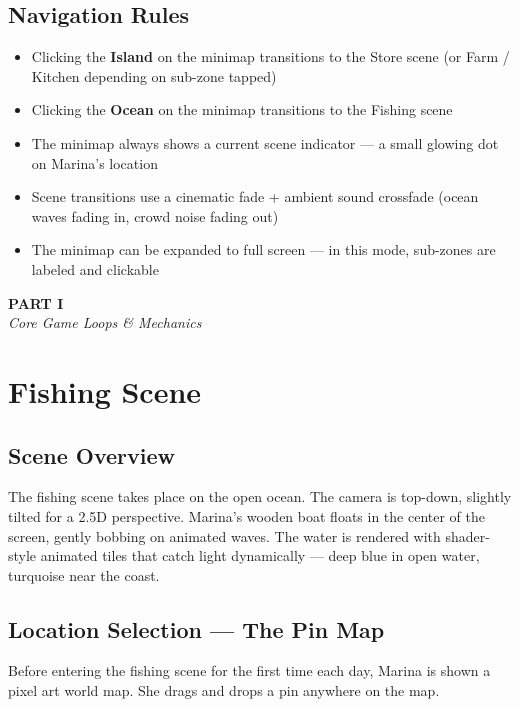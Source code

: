 \documentclass[11pt, letterpaper]{article}
\newcommand{\sectionband}[3]{%
  \begin{tcolorbox}[
    enhanced,
    colback=#3, colframe=#3,
    boxrule=0pt, arc=0pt,
    left=12pt, right=12pt, top=10pt, bottom=10pt,
    beforeafter skip=14pt,
  ]
    {\Large\bfseries\color{white}#1}\\[2pt]
    {\small\itshape\color{#3!30!white}#2}
  \end{tcolorbox}%
}
\begin{document}
\subsection{Navigation Rules}

\begin{itemize}
  \item Clicking the \textbf{Island} on the minimap transitions to the Store scene (or Farm / Kitchen depending on sub-zone tapped)
  \item Clicking the \textbf{Ocean} on the minimap transitions to the Fishing scene
  \item The minimap always shows a current scene indicator --- a small glowing dot on Marina's location
  \item Scene transitions use a cinematic fade + ambient sound crossfade (ocean waves fading in, crowd noise fading out)
  \item The minimap can be expanded to full screen --- in this mode, sub-zones are labeled and clickable
\end{itemize}

\newpage
\sectionband{PART I}{Core Game Loops \& Mechanics}{teal}
\section{Fishing Scene}

\subsection{Scene Overview}

The fishing scene takes place on the open ocean. The camera is top-down, slightly tilted for a 2.5D perspective. Marina's wooden boat floats in the center of the screen, gently bobbing on animated waves. The water is rendered with shader-style animated tiles that catch light dynamically --- deep blue in open water, turquoise near the coast.

\subsection{Location Selection --- The Pin Map}

Before entering the fishing scene for the first time each day, Marina is shown a pixel art world map. She drags and drops a pin anywhere on the map.
\end{document}
